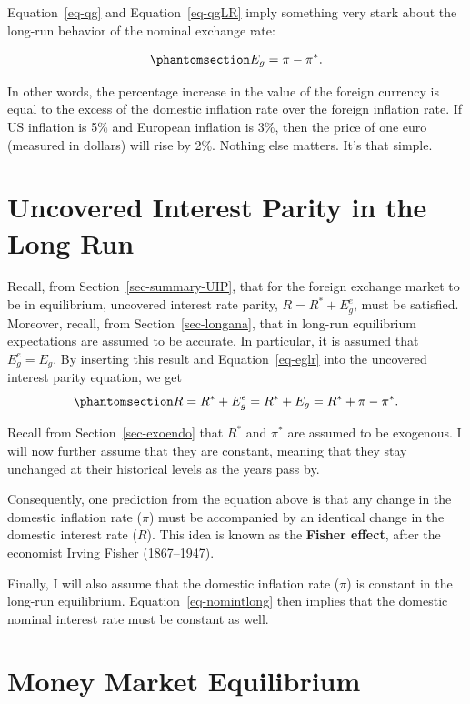 \documentclass[
  letterpaper,
]{book}
\theoremstyle{plain}
\theoremstyle{remark}
\begin{document}
Equation~\ref{eq-qg} and Equation~\ref{eq-qgLR} imply something very
stark about the long-run behavior of the nominal exchange rate:

\begin{equation}\phantomsection\label{eq-eglr}{
E_g=\pi-\pi^*.
}\end{equation}

In other words, the percentage increase in the value of the foreign
currency is equal to the excess of the domestic inflation rate over the
foreign inflation rate. If US inflation is 5\% and European inflation is
3\%, then the price of one euro (measured in dollars) will rise by 2\%.
Nothing else matters. It's that simple.

\section{Uncovered Interest Parity in the Long Run}\label{sec-uiplong}

Recall, from Section~\ref{sec-summary-UIP}, that for the foreign
exchange market to be in equilibrium, uncovered interest rate parity,
\(R=R^* + E^e_g\), must be satisfied. Moreover, recall, from
Section~\ref{sec-longana}, that in long-run equilibrium expectations are
assumed to be accurate. In particular, it is assumed that \(E^e_g=E_g\).
By inserting this result and Equation~\ref{eq-eglr} into the uncovered
interest parity equation, we get
\begin{equation}\phantomsection\label{eq-nomintlong}{
R=R^* + E^e_g=R^* + E_g=R^*+\pi-\pi^*.
}\end{equation}

Recall from Section~\ref{sec-exoendo} that \(R^*\) and \(\pi^*\) are
assumed to be exogenous. I will now further assume that they are
constant, meaning that they stay unchanged at their historical levels as
the years pass by.

Consequently, one prediction from the equation above is that any change
in the domestic inflation rate (\(\pi\)) must be accompanied by an
identical change in the domestic interest rate (\(R\)). This idea is
known as the \textbf{Fisher effect}, after the economist Irving Fisher
(1867--1947).

Finally, I will also assume that the domestic inflation rate (\(\pi\))
is constant in the long-run equilibrium. Equation~\ref{eq-nomintlong}
then implies that the domestic nominal interest rate must be constant as
well.

\section{Money Market Equilibrium}\label{sec-moneqmlong}
\end{document}
